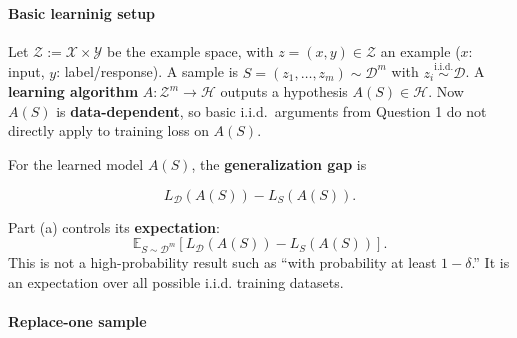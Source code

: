 \documentclass[11pt,a4paper]{article}
\theoremstyle{definition}
\begin{document}
\begin{center}
{%
}
\end{center}

\paragraph{Basic learninig setup}

Let $\mathcal{Z} := \mathcal{X} \times \mathcal{Y}$ be the example space, with $z = (x, y) \in \mathcal{Z}$ an example ($x$: input, $y$: label/response). A sample is $S = (z_1, \dots, z_m) \sim \mathcal{D}^m$ with $z_i \overset{\text{i.i.d.}}{\sim} \mathcal{D}$. A \textbf{learning algorithm} $A : \mathcal{Z}^m \to \mathcal{H}$ outputs a hypothesis $A(S) \in \mathcal{H}$. Now $A(S)$ is \textbf{data-dependent}, so basic i.i.d.\ arguments from Question 1 do not directly apply to training loss on $A(S)$.

For the learned model $A(S)$, the \textbf{generalization gap} is

\[
L_{\mathcal{D}}(A(S)) - L_{S}(A(S)).
\]

Part (a) controls its \textbf{expectation}:
\[
\mathbb{E}_{S \sim \mathcal{D}^m} [L_{\mathcal{D}}(A(S)) - L_{S}(A(S))].
\]
This is not a high-probability result such as ``with probability at least $1 - \delta$.'' It is an expectation over all possible i.i.d. training datasets.


\paragraph{Replace-one sample}
\end{document}
